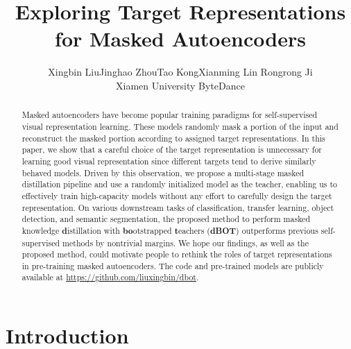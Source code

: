 \documentclass[10pt,twocolumn,letterpaper]{article}
\def\ourmethod{{dBOT}\xspace}
\newcommand*{\affaddr}[1]{#1} \newcommand*{\affmark}[1][*]{\textsuperscript{#1}}
\begin{document}
\title{
Exploring Target Representations for Masked Autoencoders
}


\author{Xingbin Liu\footnotemark[1] 
	\quad Jinghao Zhou\footnotemark[1]
	\quad Tao Kong\footnotemark[2]
	\quad Xianming Lin 
	\quad  Rongrong Ji\\
	\affaddr{Xiamen University} \quad \affaddr{ByteDance} \quad \\
}

\maketitle
\renewcommand{\thefootnote}{\fnsymbol{footnote}}
{\let\thefootnote\relax{}}



\begin{abstract}

Masked autoencoders have become popular training paradigms for self-supervised visual representation learning. These models randomly mask a portion of the input and reconstruct the masked portion according to assigned target representations. 
In this paper, we show that a careful choice of the target representation is unnecessary for learning good visual representation since different targets tend to derive similarly behaved models. 
Driven by this observation, we propose a multi-stage masked distillation pipeline and use a randomly initialized model as the teacher, enabling us to effectively train high-capacity models without any effort to carefully design the target representation. 
On various downstream tasks of classification, transfer learning, object detection, and semantic segmentation, the proposed method to perform masked knowledge \textbf{d}istillation with \textbf{bo}otstrapped \textbf{t}eachers (\textbf{\ourmethod}) outperforms previous self-supervised methods by nontrivial margins. 
We hope our findings, as well as the proposed method, could motivate people to rethink the roles of target representations in pre-training masked autoencoders.
The code and pre-trained models are publicly available at \url{https://github.com/liuxingbin/dbot}.
\end{abstract}


\section{Introduction}
\end{document}
